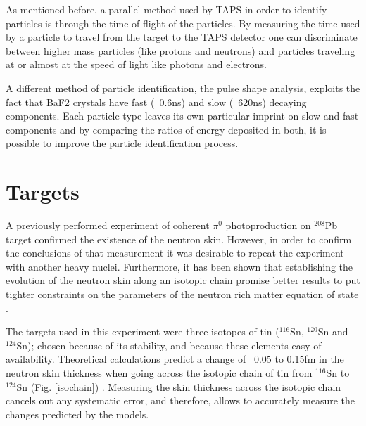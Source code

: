 \indent As mentioned before, a parallel method used by TAPS in order to identify particles is through the time of flight of the particles. By measuring  the  time used by a  particle to travel  from  the  target  to the TAPS detector one can discriminate between higher mass particles (like protons and neutrons) and particles traveling at or almost at the speed of light like photons and electrons.

\indent A different method of particle identification, the pulse shape analysis, exploits the fact  that  BaF2  crystals  have  fast  (~0.6ns)  and  slow  (~620ns)  decaying components. Each particle type leaves its own particular imprint on slow and fast components and by comparing the ratios of energy deposited in both, it is possible to improve the particle identification process.

\section{Targets}

\indent A previously performed experiment of coherent $\pi^{0}$ photoproduction on $^{208}$Pb target confirmed the existence of the neutron skin. However, in order to confirm the conclusions of that measurement it was desirable to repeat the experiment with another  heavy  nuclei.  Furthermore,  it  has  been shown  that establishing the evolution of the neutron skin  along  an isotopic  chain  promise  better  results  to  put  tighter constraints on the parameters of the neutron rich matter equation of state \cite{centelles}.

\indent The targets used in this experiment were three isotopes of tin ($^{116}$Sn, $^{120}$Sn and $^{124}$Sn); chosen because of its stability, and because these elements easy of availability. Theoretical  calculations  predict  a change of  ~0.05  to  0.15fm  in  the neutron  skin thickness when going across the isotopic chain of tin from $^{116}$Sn to $^{124}$Sn (Fig. \ref{isochain}) \cite{liewen}. Measuring the skin thickness across the  isotopic  chain  cancels  out  any systematic error,  and  therefore,  allows  to accurately measure the changes predicted by the models.


